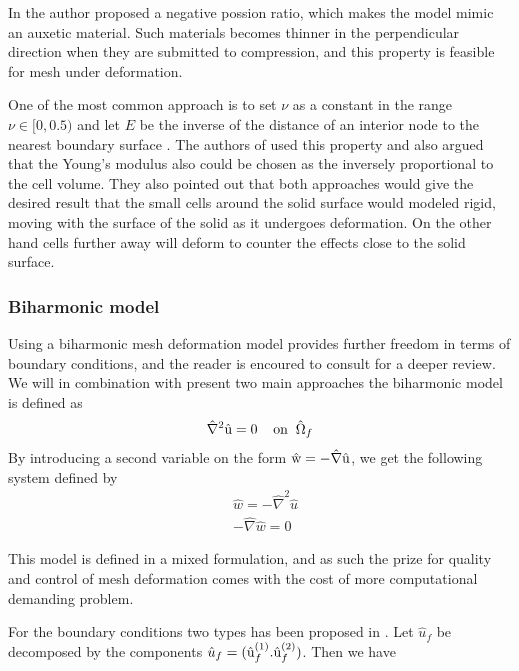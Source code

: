 In \cite{Wicka} the author proposed a negative possion ratio, which makes the model mimic an auxetic material. Such materials becomes thinner in the perpendicular direction when they are submitted to compression, and this property is feasible for mesh under deformation. 

One of the most common approach is to set $\nu$ as a constant in the range $\nu \in [0, 0.5)$ and let $E$ be the inverse of the distance of an interior node to the nearest boundary surface \cite{MM2016}. 
The authors of \cite{Biedron} used this property and also argued that the Young's modulus also could be chosen as the inversely proportional to the cell volume. They also pointed out that both approaches would give the desired result that the small cells around the solid surface would modeled rigid, moving with the surface of the solid as it undergoes deformation. On the other hand cells further away will deform to counter the effects close to the solid surface.

\subsubsection*{Biharmonic model}
Using a biharmonic mesh deformation model provides further freedom in terms of boundary conditions, and the reader is encoured to consult \cite{Helenbrook2003} for a deeper review. We will in combination with \cite{Wicka} present two main approaches the biharmonic model is defined as 
\begin{align*}
\hat{\nabla}^2 \text{\^{u}} = 0 \hspace{4mm} \text{on} \hspace{2mm} \hat{\Omega}_f 
\end{align*}
By introducing a second variable on the form $\text{\^{w}} = - \hat{\nabla} \text{\^{u}}$, we get the following system defined by 
\begin{align*}
&\hat{w} = -\hat{\nabla}^2\hat{u} \\
&- \hat{\nabla} \hat{w} = 0
\end{align*}

This model is defined in a mixed formulation, and as such the prize for quality and control of mesh deformation comes with the cost of more computational demanding problem. 

For the boundary conditions two types has been proposed in \cite{Wicka}. Let 
$\hat{u}_f$ be decomposed by the components $\hat{u}_f = (\text{\^{u}}_f^{(1)}. \text{\^{u}}_f^{(2)})$. Then we have

